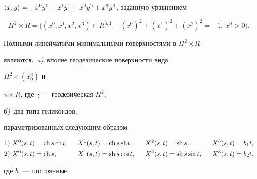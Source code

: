 $\langle x,y\rangle=-x^0y^0+x^1y^1+x^2y^2+x^3y^3$, заданную уравнением 


$$ 


H^2 \times R= \big((x^0,x^1,x^2,x^3) \in


R^{3,1} :-(x^0)^2+(x^1)^2+(x^2)^2=-1,\ x^0>0 \big).


$$





\begin{thm}


Полными линейчатыми минимальными поверхностями в $H^2 \times R$


являются\/${:}$ {\em a)}~вполне геодезические поверхности вида


$H^2 \times (x^3_0)$ и 


$\gamma \times R$, где $ \gamma $ --- геодезическая $H^2$,


{\em б)}~два типа геликоидов, 


параметризованных следующим образом\/${:}$


\begin{alignat*}{4}


1)\ &X^0(s,t)=\ch s\ch t,&\ \ &X^1(s,t)=\ch s\sh t,&\ \ 


&X^2(s,t)=\sh s,& \ \ &X^3(s,t)=b_1t, \\


%


2)\ &X^0(s,t)=\ch s,&\ \ &X^1(s,t)=\sh s\cos t, &\ \ 


&X^2(s,t)=\sh s \sin t, &\ \ &X^3(s,t)=b_2t,


\end{alignat*}


где $b_i$ --- постоянные.


\end{thm}





